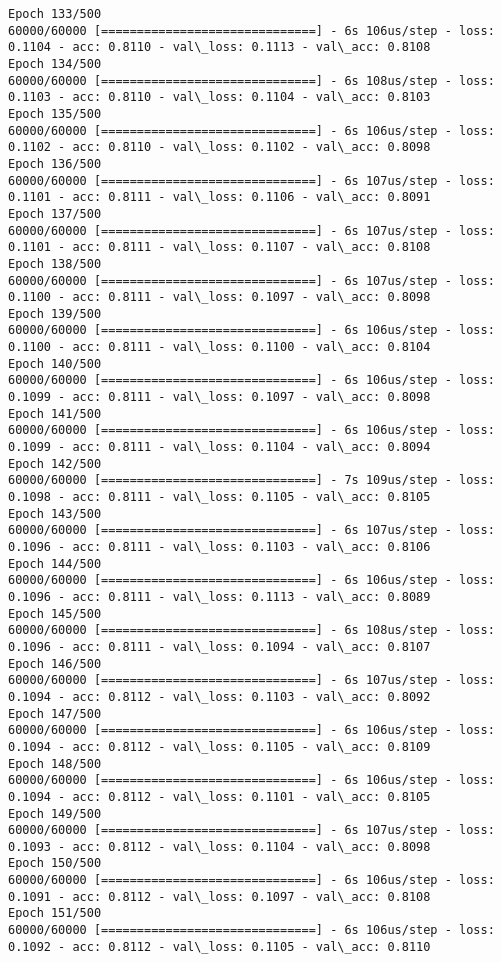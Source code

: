 \documentclass[11pt]{article}
\begin{document}
\begin{Verbatim}[commandchars=\\\{\}]
Epoch 133/500
60000/60000 [==============================] - 6s 106us/step - loss: 0.1104 - acc: 0.8110 - val\_loss: 0.1113 - val\_acc: 0.8108
Epoch 134/500
60000/60000 [==============================] - 6s 108us/step - loss: 0.1103 - acc: 0.8110 - val\_loss: 0.1104 - val\_acc: 0.8103
Epoch 135/500
60000/60000 [==============================] - 6s 106us/step - loss: 0.1102 - acc: 0.8110 - val\_loss: 0.1102 - val\_acc: 0.8098
Epoch 136/500
60000/60000 [==============================] - 6s 107us/step - loss: 0.1101 - acc: 0.8111 - val\_loss: 0.1106 - val\_acc: 0.8091
Epoch 137/500
60000/60000 [==============================] - 6s 107us/step - loss: 0.1101 - acc: 0.8111 - val\_loss: 0.1107 - val\_acc: 0.8108
Epoch 138/500
60000/60000 [==============================] - 6s 107us/step - loss: 0.1100 - acc: 0.8111 - val\_loss: 0.1097 - val\_acc: 0.8098
Epoch 139/500
60000/60000 [==============================] - 6s 106us/step - loss: 0.1100 - acc: 0.8111 - val\_loss: 0.1100 - val\_acc: 0.8104
Epoch 140/500
60000/60000 [==============================] - 6s 106us/step - loss: 0.1099 - acc: 0.8111 - val\_loss: 0.1097 - val\_acc: 0.8098
Epoch 141/500
60000/60000 [==============================] - 6s 106us/step - loss: 0.1099 - acc: 0.8111 - val\_loss: 0.1104 - val\_acc: 0.8094
Epoch 142/500
60000/60000 [==============================] - 7s 109us/step - loss: 0.1098 - acc: 0.8111 - val\_loss: 0.1105 - val\_acc: 0.8105
Epoch 143/500
60000/60000 [==============================] - 6s 107us/step - loss: 0.1096 - acc: 0.8111 - val\_loss: 0.1103 - val\_acc: 0.8106
Epoch 144/500
60000/60000 [==============================] - 6s 106us/step - loss: 0.1096 - acc: 0.8111 - val\_loss: 0.1113 - val\_acc: 0.8089
Epoch 145/500
60000/60000 [==============================] - 6s 108us/step - loss: 0.1096 - acc: 0.8111 - val\_loss: 0.1094 - val\_acc: 0.8107
Epoch 146/500
60000/60000 [==============================] - 6s 107us/step - loss: 0.1094 - acc: 0.8112 - val\_loss: 0.1103 - val\_acc: 0.8092
Epoch 147/500
60000/60000 [==============================] - 6s 106us/step - loss: 0.1094 - acc: 0.8112 - val\_loss: 0.1105 - val\_acc: 0.8109
Epoch 148/500
60000/60000 [==============================] - 6s 106us/step - loss: 0.1094 - acc: 0.8112 - val\_loss: 0.1101 - val\_acc: 0.8105
Epoch 149/500
60000/60000 [==============================] - 6s 107us/step - loss: 0.1093 - acc: 0.8112 - val\_loss: 0.1104 - val\_acc: 0.8098
Epoch 150/500
60000/60000 [==============================] - 6s 106us/step - loss: 0.1091 - acc: 0.8112 - val\_loss: 0.1097 - val\_acc: 0.8108
Epoch 151/500
60000/60000 [==============================] - 6s 106us/step - loss: 0.1092 - acc: 0.8112 - val\_loss: 0.1105 - val\_acc: 0.8110

\end{Verbatim}
\end{document}
